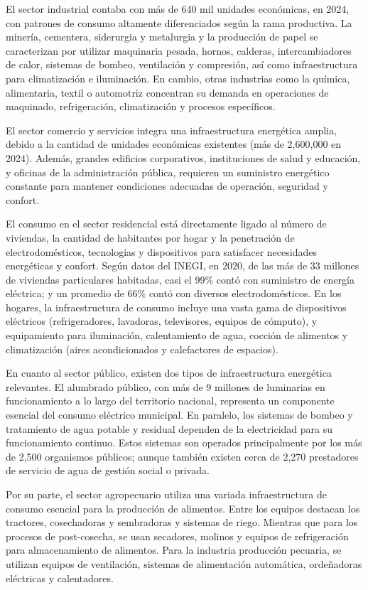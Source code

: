 \documentclass{sener2025}
\begin{document}
El sector industrial contaba con más de 640 mil unidades económicas, en 2024, con patrones de consumo altamente diferenciados según la rama productiva. La minería, cementera, siderurgia y metalurgia y la producción de papel se caracterizan por utilizar maquinaria pesada, hornos, calderas, intercambiadores de calor, sistemas de bombeo, ventilación y compresión, así como infraestructura para climatización e iluminación. En cambio, otras industrias como la química, alimentaria, textil o automotriz concentran su demanda en operaciones de maquinado, refrigeración, climatización y procesos específicos.

El sector comercio y servicios integra una infraestructura energética amplia, debido a la cantidad de unidades económicas existentes (más de 2,600,000 en 2024). Además, grandes edificios corporativos, instituciones de salud y educación, y oficinas de la administración pública, requieren un suministro energético constante para mantener condiciones adecuadas de operación, seguridad y confort.

El consumo en el sector residencial está directamente ligado al número de viviendas, la cantidad de habitantes por hogar y la penetración de electrodomésticos, tecnologías y dispositivos para satisfacer necesidades energéticas y confort. Según datos del INEGI, en 2020, de las más de 33 millones de viviendas particulares habitadas, casi el 99\% contó con suministro de energía eléctrica; y un promedio de 66\% contó con diversos electrodomésticos. En los hogares, la infraestructura de consumo incluye una vasta gama de dispositivos eléctricos (refrigeradores, lavadoras, televisores, equipos de cómputo), y equipamiento para iluminación, calentamiento de agua, cocción de alimentos y climatización (aires acondicionados y calefactores de espacios).

En cuanto al sector público, existen dos tipos de infraestructura energética relevantes. El alumbrado público, con más de 9 millones de luminarias en funcionamiento a lo largo del territorio nacional, representa un componente esencial del consumo eléctrico municipal. En paralelo, los sistemas de bombeo y tratamiento de agua potable y residual dependen de la electricidad para su funcionamiento continuo. Estos sistemas son operados principalmente por los más de 2,500 organismos públicos; aunque también existen cerca de 2,270 prestadores de servicio de agua de gestión social o privada.

Por su parte, el sector agropecuario utiliza una variada infraestructura de consumo esencial para la producción de alimentos. Entre los equipos destacan los tractores, cosechadoras y sembradoras y sistemas de riego. Mientras que para los procesos de post-cosecha, se usan secadores, molinos y equipos de refrigeración para almacenamiento de alimentos. Para la industria producción pecuaria, se utilizan equipos de ventilación, sistemas de alimentación automática, ordeñadoras eléctricas y calentadores.
\end{document}
